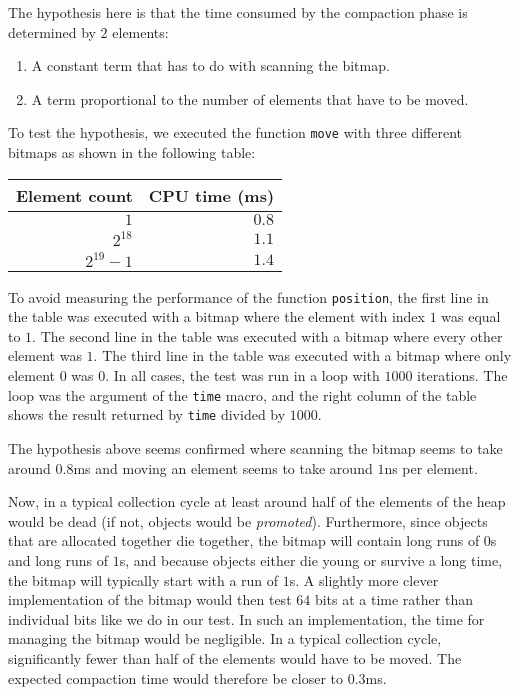 The hypothesis here is that the time consumed by the compaction phase
is determined by $2$ elements:

\begin{enumerate}
\item A constant term that has to do with scanning the bitmap.
\item A term proportional to the number of elements that have to be
  moved.
\end{enumerate}

To test the hypothesis, we executed the function \texttt{move} with
three different bitmaps as shown in the following table:

\begin{tabular}{|r|r|}
\hline
Element count & CPU time (ms)\\
\hline
$1$ & $0.8$ \\
$2^{18}$ & $1.1$\\
$2^{19}-1$ & $1.4$\\
\hline
\end{tabular}

To avoid measuring the performance of the function \texttt{position},
the first line in the table was executed with a bitmap where the
element with index $1$ was equal to $1$.  The second line in the table
was executed with a bitmap where every other element was $1$.  The
third line in the table was executed with a bitmap where only element
$0$ was $0$.  In all cases, the test was run in a loop with $1000$
iterations.  The loop was the argument of the \texttt{time} macro, and
the right column of the table shows the result returned by
\texttt{time} divided by $1000$. 

The hypothesis above seems confirmed where scanning the bitmap seems
to take around $0.8$ms and moving an element seems to take around
$1$ns per element.  

Now, in a typical collection cycle at least around half of the
elements of the heap would be dead (if not, objects would be
\emph{promoted}).  Furthermore, since objects that are allocated
together die together, the bitmap will contain long runs of $0$s and
long runs of $1$s, and because objects either die young or survive a
long time, the bitmap will typically start with a run of $1$s.  A
slightly more clever implementation of the bitmap would then test $64$
bits at a time rather than individual bits like we do in our test.  In
such an implementation, the time for managing the bitmap would be
negligible.  In a typical collection cycle, significantly fewer than
half of the elements would have to be moved.  The expected compaction
time would therefore be closer to $0.3$ms. 

